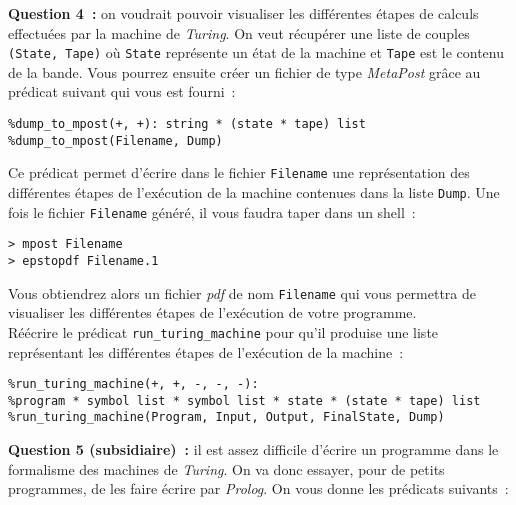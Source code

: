 \documentclass[a4paper]{article}
\begin{document}
\indent\textbf{Question 4~:} on voudrait pouvoir visualiser les différentes étapes de calculs effectuées par la machine de \emph{Turing}. On veut récupérer
une liste de couples \texttt{(State, Tape)} où \texttt{State} représente un état de la machine et \texttt{Tape} est le contenu de la bande. Vous pourrez ensuite
créer un fichier de type \emph{MetaPost} grâce au prédicat suivant qui vous est fourni~:
\begin{verbatim}
%dump_to_mpost(+, +): string * (state * tape) list
%dump_to_mpost(Filename, Dump)
\end{verbatim}

\noindent Ce prédicat permet d'écrire dans le fichier \texttt{Filename} une représentation des différentes étapes de l'exécution de la machine contenues dans la liste \texttt{Dump}.
Une fois le fichier \texttt{Filename} généré, il vous faudra taper dans un shell~:
\begin{verbatim}
> mpost Filename
> epstopdf Filename.1
\end{verbatim}
Vous obtiendrez alors un fichier \emph{pdf} de nom \texttt{Filename} qui vous permettra de visualiser les différentes étapes de l'exécution de votre programme.\\

Réécrire le prédicat \texttt{run_turing_machine} pour qu'il produise une liste représentant les différentes étapes de l'exécution de la machine~:
\begin{verbatim}
%run_turing_machine(+, +, -, -, -): 
%program * symbol list * symbol list * state * (state * tape) list 
%run_turing_machine(Program, Input, Output, FinalState, Dump)
\end{verbatim}

\indent\textbf{Question 5 (subsidiaire)~:} il est assez difficile d'écrire un 
programme dans le formalisme des machines de \emph{Turing}. On va donc essayer, pour de petits programmes, de les faire
écrire par \emph{Prolog}. On vous donne les prédicats suivants~:
\end{document}
